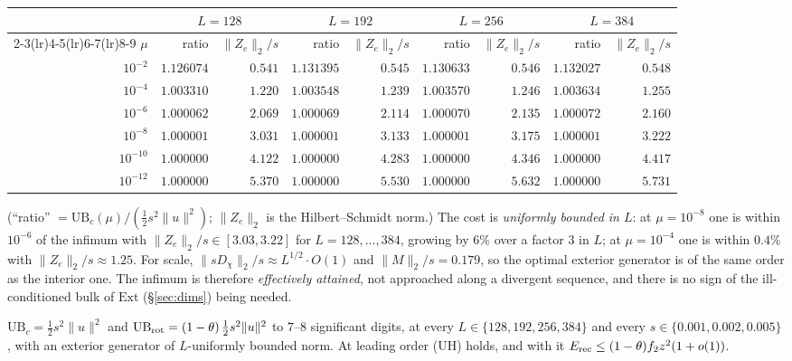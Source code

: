 \documentclass[11pt]{article}
\begin{document}
\begin{center}\small
\begin{tabular}{r rr rr rr rr}
\toprule
&\multicolumn{2}{c}{$L=128$}&\multicolumn{2}{c}{$L=192$}&\multicolumn{2}{c}{$L=256$}&\multicolumn{2}{c}{$L=384$}\\
\cmidrule(lr){2-3}\cmidrule(lr){4-5}\cmidrule(lr){6-7}\cmidrule(lr){8-9}
$\mu$&ratio&$\|Z_e\|_2/s$&ratio&$\|Z_e\|_2/s$&ratio&$\|Z_e\|_2/s$&ratio&$\|Z_e\|_2/s$\\
\midrule
$10^{-2}$ &$1.126074$&$0.541$&$1.131395$&$0.545$&$1.130633$&$0.546$&$1.132027$&$0.548$\\
$10^{-4}$ &$1.003310$&$1.220$&$1.003548$&$1.239$&$1.003570$&$1.246$&$1.003634$&$1.255$\\
$10^{-6}$ &$1.000062$&$2.069$&$1.000069$&$2.114$&$1.000070$&$2.135$&$1.000072$&$2.160$\\
$10^{-8}$ &$1.000001$&$3.031$&$1.000001$&$3.133$&$1.000001$&$3.175$&$1.000001$&$3.222$\\
$10^{-10}$&$1.000000$&$4.122$&$1.000000$&$4.283$&$1.000000$&$4.346$&$1.000000$&$4.417$\\
$10^{-12}$&$1.000000$&$5.370$&$1.000000$&$5.530$&$1.000000$&$5.632$&$1.000000$&$5.731$\\
\bottomrule
\end{tabular}
\end{center}
(``ratio'' $=\mathrm{UB}_c(\mu)/(\tfrac12 s^2\|u\|^2)$; $\|Z_e\|_2$ is the
Hilbert--Schmidt norm.)  The cost is \emph{uniformly bounded in $L$}: at $\mu=10^{-8}$ one
is within $10^{-6}$ of the infimum with $\|Z_e\|_2/s\in[3.03,3.22]$ for $L=128,\dots,384$,
growing by $6\%$ over a factor $3$ in $L$; at $\mu=10^{-4}$ one is within $0.4\%$ with
$\|Z_e\|_2/s\approx1.25$.  For scale, $\|sD_\chi\|_2/s\approx L^{1/2}\cdot O(1)$ and
$\|M\|_2/s=0.179$, so the optimal exterior generator is of the same order as the interior
one.  The infimum is therefore \emph{effectively attained}, not approached along a
divergent sequence, and there is no sign of the ill-conditioned bulk of $\mathrm{Ext}$
(\S\ref{sec:dims}) being needed.

\begin{verdictok}
$\mathrm{UB}_c=\tfrac12 s^2\|u\|^2$ and $\mathrm{UB}_{\rm rot}=(1-\theta)\,\tfrac12 s^2\|u\|^2$
to $7$--$8$ significant digits, at every $L\in\{128,192,256,384\}$ and every
$s\in\{0.001,0.002,0.005\}$, with an exterior generator of $L$-uniformly bounded norm.
At leading order (UH) holds, and with it $E_{\rm rec}\le(1-\theta)f_2z^2(1+o(1))$.
\end{verdictok}
\end{document}

